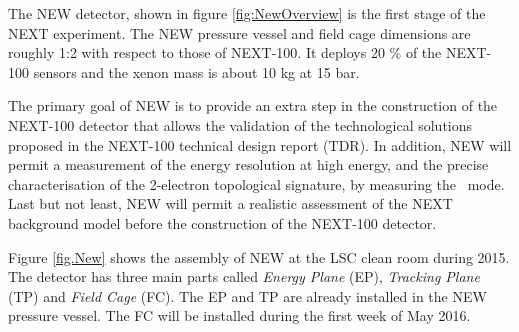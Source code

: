 The NEW detector, shown in figure \ref{fig:NewOverview} is the first stage of the NEXT experiment. The NEW pressure vessel  and field cage
 dimensions are roughly 1:2 with respect to those of NEXT-100. It deploys 20 \% of the NEXT-100 sensors and the xenon mass is about 10 kg at 15 bar. 

The primary goal of NEW is to provide an extra step in the construction of the NEXT-100 detector that allows the validation of the technological solutions proposed in the NEXT-100 technical design report (TDR)\cite{Alvarez:2012haa}. In addition, NEW will permit a measurement of the energy resolution at high energy, and the precise characterisation of the 2-electron topological signature, by measuring the \bbtnu\ mode. Last but not least, NEW will permit a realistic assessment of the NEXT background model before the construction of the NEXT-100 detector. 

Figure \ref{fig.New} shows the assembly of NEW at the LSC clean room during 2015. The detector has three main parts called {\em Energy Plane} (EP), {\em Tracking Plane} (TP) and {\em Field Cage} (FC). The EP and TP are already installed in the NEW pressure vessel. The FC will be installed during the first week of May 2016.

%
%
%
%
%

